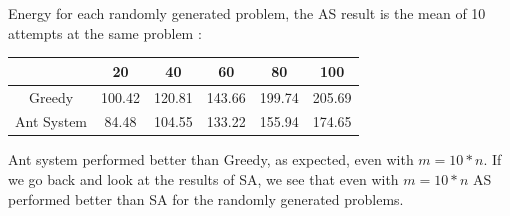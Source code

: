 \documentclass[a4paper]{article}
\begin{document}
\begin{center}
Energy for each randomly generated problem, the AS result is the mean of 10 attempts at the same problem :\\
\begin{tabular}{|c|c|c|c|c|c|}
\hline
{\color[HTML]{000000} }           & {\color[HTML]{000000} 20}     & {\color[HTML]{000000} 40}     & {\color[HTML]{000000} 60}     & 80     & 100    \\ \hline
{\color[HTML]{000000} Greedy}     & {\color[HTML]{000000} 100.42} & {\color[HTML]{000000} 120.81} & {\color[HTML]{000000} 143.66} & 199.74 & 205.69 \\ \hline
{\color[HTML]{000000} Ant System} & {\color[HTML]{000000} 84.48}  & {\color[HTML]{000000} 104.55} & {\color[HTML]{000000} 133.22} & 155.94 & 174.65 \\ \hline
\end{tabular}
\end{center}
Ant system performed better than Greedy, as expected, even with $m=10*n$. If we go back and look at the results of SA, we see that even with $m=10*n$ AS performed better than SA for the randomly generated problems. 
\end{document}
